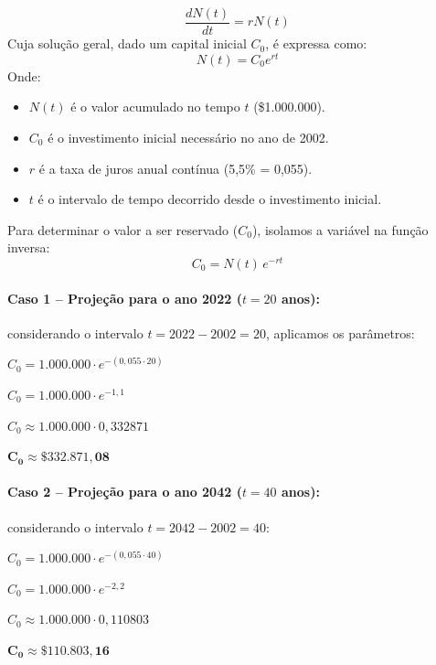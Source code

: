 \begin{equation}
\frac{dN(t)}{dt} = rN(t) \tag{Eq 5.1}
\end{equation}
Cuja solução geral, dado um capital inicial $C_0$, é expressa como:
\begin{equation}
N(t) = C_0 e^{rt} \tag{Eq 5.4}
\end{equation}
Onde:
\begin{itemize}
  \item $N(t)$ é o valor acumulado no tempo $t$ (\$1.000.000).
  \item $C_0$ é o investimento inicial necessário no ano de 2002.
  \item $r$ é a taxa de juros anual contínua (5,5\% = 0,055).
  \item $t$ é o intervalo de tempo decorrido desde o investimento inicial.
\end{itemize}
Para determinar o valor a ser reservado ($C_0$), isolamos a variável na função inversa:
\begin{equation}
C_0 = N(t)\, e^{-rt}
\end{equation}

\paragraph{Caso 1 -- Projeção para o ano 2022 ($t=20$ anos):} considerando o intervalo $t=2022-2002=20$, aplicamos os parâmetros:

$C_0 = 1{.}000{.}000 \cdot e^{-(0{,}055 \cdot 20)}$

$C_0 = 1{.}000{.}000 \cdot e^{-1{,}1}$

$C_0 \approx 1{.}000{.}000 \cdot 0{,}332871$

$\mathbf{C_0 \approx \$332.871{,}08}$

\paragraph{Caso 2 -- Projeção para o ano 2042 ($t=40$ anos):} considerando o intervalo $t=2042-2002=40$:

$C_0 = 1{.}000{.}000 \cdot e^{-(0{,}055 \cdot 40)}$

$C_0 = 1{.}000{.}000 \cdot e^{-2{,}2}$

$C_0 \approx 1{.}000{.}000 \cdot 0{,}110803$

$\mathbf{C_0 \approx \$110.803{,}16}$
